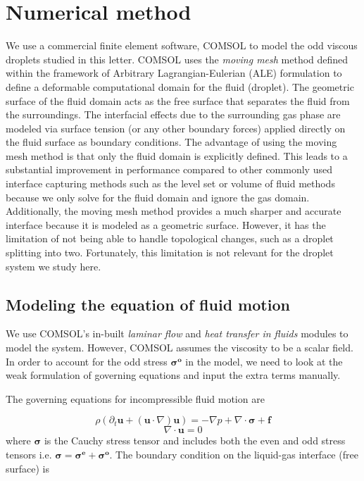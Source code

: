 \documentclass[%
 amsmath,amssymb,
 aps,
10.5pt]{revtex4-2}
\begin{document}
\section{Numerical method}
We use a commercial finite element software, COMSOL\cite{comsol2022comsol} to model the odd viscous droplets studied in this letter. COMSOL uses the \textit{moving mesh} method defined within the framework of Arbitrary Lagrangian-Eulerian (ALE) formulation \cite{donea2004arbitrary} to define a deformable computational domain for the fluid (droplet). The geometric surface of the fluid domain acts as the free surface that separates the fluid from the surroundings. The interfacial effects due to the surrounding gas phase are modeled via surface tension (or any other boundary forces) applied directly on the fluid surface as boundary conditions. The advantage of using the moving mesh method is that only the fluid domain is explicitly defined. This leads to a substantial improvement in performance compared to other commonly used interface capturing methods such as the level set \cite{sethian2003level} or volume of fluid \cite{hirt1981volume} methods because we only solve for the fluid domain and ignore the gas domain. Additionally, the moving mesh method provides a much sharper and accurate interface because it is modeled as a geometric surface. However, it has the limitation of not being able to handle topological changes, such as a droplet splitting into two. Fortunately, this limitation is not relevant for the droplet system we study here.










\subsection{Modeling the equation of fluid motion}
We use COMSOL's in-built \textit{laminar flow} and \textit{heat transfer in fluids} modules to model the system. However, COMSOL assumes the viscosity to be a scalar field. In order to account for the odd stress $\boldsymbol{\sigma^o}$ in the model, we need to look at the weak formulation of governing equations and input the extra terms manually.

The governing equations for incompressible fluid motion are 

\begin{equation} \label{eq:NS-eom}
    \rho (\partial_t \boldsymbol{u} + (\boldsymbol{u}\cdot \nabla)\boldsymbol{u}) = -\nabla p +\nabla \cdot \boldsymbol{\sigma} + \boldsymbol{f}
\end{equation}
\begin{equation}\label{eq:NS-incomp}
    \nabla \cdot \boldsymbol{u} = 0
\end{equation}
where $\boldsymbol{\sigma}$ is the Cauchy stress tensor and includes both the even and odd stress tensors i.e. $\boldsymbol{\sigma}=\boldsymbol{\sigma^e}+\boldsymbol{\sigma^o}$. The boundary condition on the liquid-gas interface (free surface) is
\end{document}
